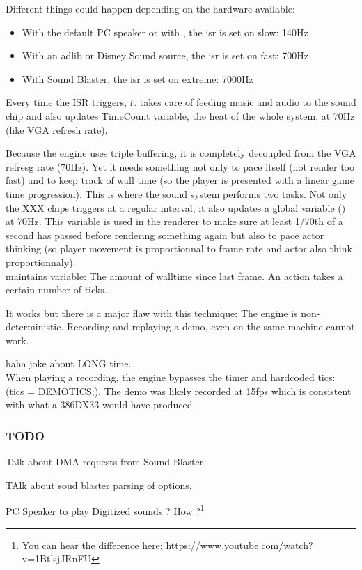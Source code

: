 Different things could happen depending on the hardware available:
\begin{itemize}
\item With the default PC speaker or with , the isr is set on slow: 140Hz
\item With an adlib or Disney Sound source, the isr is set on fast: 700Hz
\item With Sound Blaster, the isr is set on extreme: 7000Hz
\end{itemize}
Every time the ISR triggers, it takes care of feeding music and audio to the sound chip and also updates TimeCount variable, the heat of the whole system, at 70Hz (like VGA refresh rate).\\
\par
Because the engine uses triple buffering, it is completely decoupled from the VGA refresg rate (70Hz). Yet it needs something not only to pace itself (not render too fast) and to keep track of wall time (so the player is presented with a linear game time progression). This is where the sound system performs two tasks. Not only the XXX chips triggers at a regular interval, it also updates a global variable () at 70Hz. This variable is used in the renderer to make sure at least 1/70th of a second has passed before rendering something again but also to pace actor thinking (so player movement is proportionnal to frame rate and actor also think proportionnaly).\\
 maintains  variable: The amount of walltime since last frame. An action takes a certain number of ticks.\\
\par
It works but there is a major flaw with this technique: The engine is non-deterministic. Recording and replaying a demo, even on the same machine cannot work.\\\par
haha joke about LONG time.\\
 When playing a recording, the engine bypasses the timer and hardcoded tics: (tics = DEMOTICS;). The demo was likely recorded at 15fps which is consistent with what a 386DX33 would have produced

\subsubsection{TODO}
Talk about DMA requests from Sound Blaster.\\
\par
TAlk about soud blaster parsing of options.\\
\begin{minipage}{\textwidth}

\end{minipage}


PC Speaker to play Digitized sounds ? How  ?\footnote{You can hear the difference here: https://www.youtube.com/watch?v=1BtlsjJRnFU}\\





















